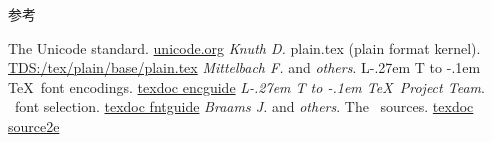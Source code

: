 \documentclass{beamer}
\makeatletter
\DeclareRobustCommand\LaTeX{L\kern-.27em%
  {\sbox\z@ T%
   \vbox to\ht\z@{\hbox{\check@mathfonts
                        \fontsize\sf@size\z@
                        \math@fontsfalse\selectfont
                        A}%
                  \vss}%
  }%
  \kern-.1em%
  \TeX}
\makeatother
\begin{document}
\begin{frame}{参考}
\begin{thebibliography}{9}
  The Unicode standard.\newblock
  \href{https://www.unicode.org/versions/latest/}
       {\ttfamily unicode.org}
  \textit{Knuth D.}\enskip
  plain.tex (plain format kernel).\newblock
  \href{http://mirrors.ctan.org/macros/plain/base/plain.tex}
       {\ttfamily TDS:/tex/plain/base/plain.tex}
  \textit{Mittelbach F.} and \textit{others}.\enskip
  \LaTeX\ font encodings.\newblock
  \href{http://mirrors.ctan.org/macros/latex/base/encguide.pdf}
       {\ttfamily texdoc encguide}
  \textit{\LaTeX\ Project Team}.\enskip
  \LaTeXe\ font selection.\newblock
  \href{http://mirrors.ctan.org/macros/latex/base/fntguide.pdf}
       {\ttfamily texdoc fntguide}
  \textit{Braams J.} and \textit{others}.\enskip
  The \LaTeXe\ sources.\newblock
  \href{http://mirrors.ctan.org/macros/latex/base/source2e.pdf}
       {\ttfamily texdoc source2e}
\end{thebibliography}
\end{frame}
\end{document}
